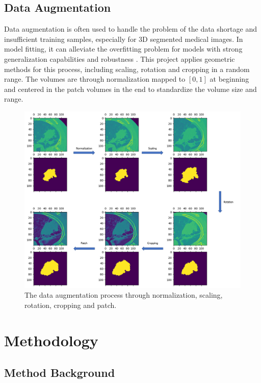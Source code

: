 \documentclass[11pt,times,oneside,openright]{eeereport}
\begin{document}
\section{Data Augmentation}
Data augmentation is often used to handle the problem of the data shortage and insufficient training samples, especially for 3D segmented medical images. In model fitting, it can alleviate the overfitting problem for models with strong generalization capabilities and robustness \cite{taylor2018improving}. This project applies geometric methods for this process, including scaling, rotation and cropping in a random range. The volumes are through normalization mapped to \(\left [ 0, 1 \right ]\) at beginning and centered in the patch volumes in the end to standardize the volume size and range.

\begin{figure}[h]
    \centering
    \includegraphics[width=\textwidth]{fig/dataset/augmentation.png}
    \caption{The data augmentation process through normalization, scaling, rotation, cropping and patch.}
    \label{fig:augmentation}
\end{figure}

\chapter{Methodology}\label{cpt:method}

\section{Method Background}
\end{document}
